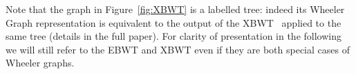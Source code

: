 Note that the graph in Figure~\ref{fig:XBWT} is a labelled tree: indeed its Wheeler Graph representation is equivalent to the output of the XBWT~\cite{ferragina2009compressing} applied to the same tree (details in the full paper). For clarity of presentation in the following we will still refer to the EBWT and XBWT even if they are both special cases of Wheeler graphs. 